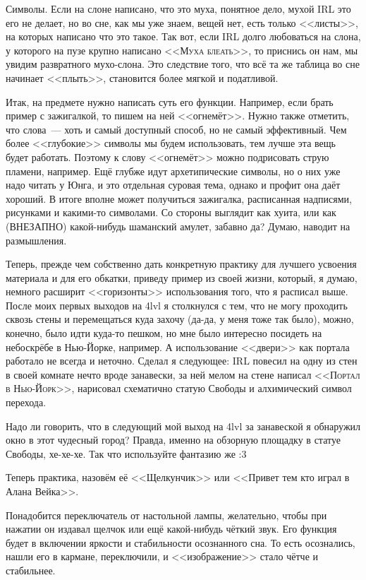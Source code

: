 \documentclass[a5paper,12pt,twoside]{memoir}
\begin{document}
Символы. Если на слоне написано, что это муха, понятное дело, мухой IRL это его не делает, но во сне, как мы уже знаем, вещей нет, есть только <<листы>>, на которых написано что это такое. Так вот, если IRL долго любоваться на слона, у которого на пузе крупно написано <<\textsc{Муха блеать}>>, то приснись он нам, мы увидим развратного мухо-слона. Это следствие того, что всё та же таблица во сне начинает <<плыть>>, становится более мягкой и податливой. 

Итак, на предмете нужно написать суть его функции. Например, если брать пример с зажигалкой, то пишем на ней <<огнемёт>>. Нужно также отметить, что слова~--- хоть и самый доступный способ, но не самый эффективный. Чем более <<глубокие>> символы мы будем использовать, тем лучше эта вещь будет работать. Поэтому к слову <<огнемёт>> можно подрисовать струю пламени, например. Ещё глубже идут архетипические символы, но о них уже надо читать у Юнга, и это отдельная суровая тема, однако и профит она даёт хороший. 
В итоге вполне может получиться зажигалка, расписанная надписями, рисунками и какими-то символами. Со стороны выглядит как хуита, или как (ВНЕЗАПНО) какой-нибудь шаманский амулет, забавно да? Думаю, наводит на размышления. 

Теперь, прежде чем собственно дать конкретную практику для лучшего усвоения материала и для его обкатки, приведу пример из своей жизни, который, я думаю, немного расширит <<горизонты>> использования того, что я расписал выше.
\smallskip
После моих первых выходов на 4lvl я столкнулся с тем, что не могу проходить сквозь стены и перемещаться куда захочу (да-да, у меня тоже так было), можно, конечно, было идти куда-то пешком, но мне было интересно посидеть на небоскрёбе в Нью-Йорке, например. А использование <<двери>> как портала работало не всегда и неточно. Сделал я следующее: IRL повесил на одну из стен в своей комнате нечто вроде занавески, за ней мелом на стене написал <<\textsc{Портал в Нью-Йорк}>>, нарисовал схематично статую Свободы и алхимический символ перехода.
 
Надо ли говорить, что в следующий мой выход на 4lvl за занавеской я обнаружил окно в этот чудесный город? Правда, именно на обзорную площадку в статуе Свободы, хе-хе-хе.
Так что используйте фантазию же :3 

Теперь практика, назовём её <<Щелкунчик>> или <<Привет тем кто играл в Алана Вейка>>.
 
Понадобится переключатель от настольной лампы, желательно, чтобы при нажатии он издавал щелчок или ещё какой-нибудь чёткий звук. Его функция будет в включении яркости и стабильности осознанного сна. То есть осознались, нашли его в кармане, переключили, и <<изображение>> стало чётче и стабильнее.
\end{document}
